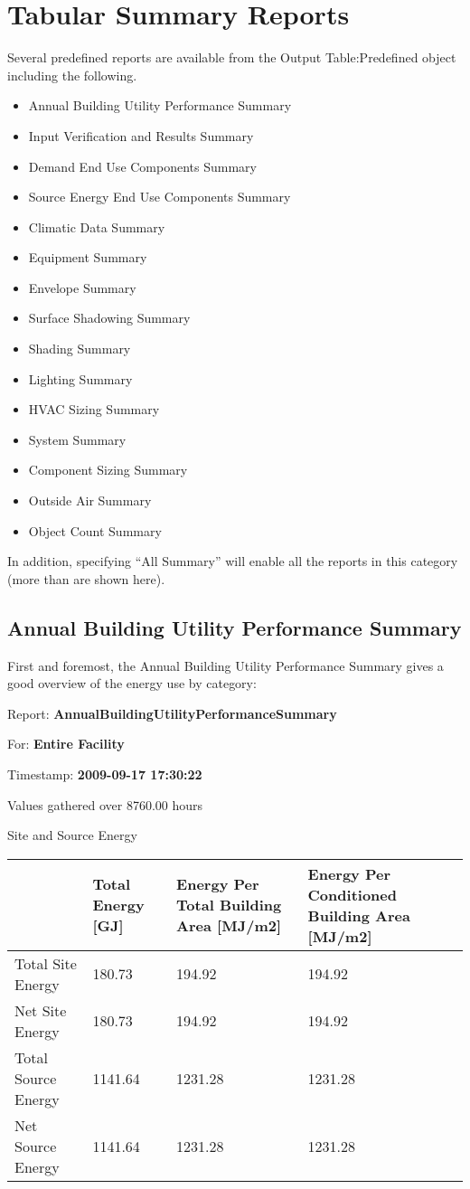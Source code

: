 \section{Tabular Summary Reports}\label{tabular-summary-reports}

Several predefined reports are available from the Output Table:Predefined object including the following.

\begin{itemize}
\item
  Annual Building Utility Performance Summary
\item
  Input Verification and Results Summary
\item
  Demand End Use Components Summary
\item
  Source Energy End Use Components Summary
\item
  Climatic Data Summary
\item
  Equipment Summary
\item
  Envelope Summary
\item
  Surface Shadowing Summary
\item
  Shading Summary
\item
  Lighting Summary
\item
  HVAC Sizing Summary
\item
  System Summary
\item
  Component Sizing Summary
\item
  Outside Air Summary
\item
  Object Count Summary
\end{itemize}

In addition, specifying ``All Summary'' will enable all the reports in this category (more than are shown here).

\subsection{Annual Building Utility Performance Summary}\label{annual-building-utility-performance-summary}

First and foremost, the Annual Building Utility Performance Summary gives a good overview of the energy use by category:

Report: \textbf{AnnualBuildingUtilityPerformanceSummary}

For: \textbf{Entire Facility}

Timestamp: \textbf{2009-09-17 17:30:22}

Values gathered over 8760.00 hours

Site and Source Energy

\begin{longtable}[c]{p{1.5in}p{1.5in}p{1.5in}p{1.5in}}
\toprule 
~ & Total Energy [GJ] & Energy Per Total Building Area [MJ/m2] & Energy Per Conditioned Building Area [MJ/m2] \tabularnewline \midrule
\endhead
Total Site Energy & 180.73 & 194.92 & 194.92 \tabularnewline
Net Site Energy & 180.73 & 194.92 & 194.92 \tabularnewline
Total Source Energy & 1141.64 & 1231.28 & 1231.28 \tabularnewline
Net Source Energy & 1141.64 & 1231.28 & 1231.28 \tabularnewline
\bottomrule
\end{longtable}
